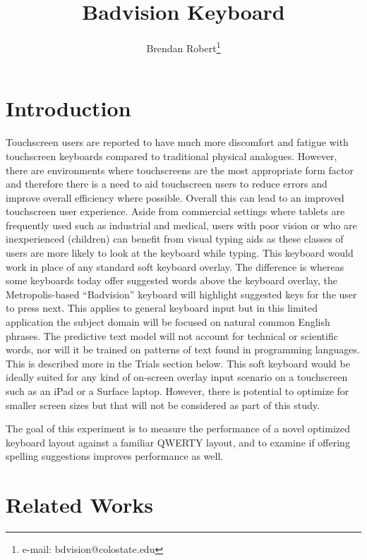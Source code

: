 \documentclass[english]{vgtc}
\author{Brendan Robert\thanks{e-mail: bdvision@colostate.edu}}
\begin{document}
\title{Badvision Keyboard}
\maketitle

\section{Introduction}

Touchscreen users are reported to have much more discomfort and fatigue
with touchscreen keyboards \cite{chaparro13} compared to traditional
physical analogues. However, there are environments where touchscreens
are the most appropriate form factor and therefore there is a need
to aid touchscreen users to reduce errors and improve overall efficiency
where possible. Overall this can lead to an improved touchscreen user
experience. Aside from commercial settings where tablets are frequently
used such as industrial and medical, users with poor vision or who
are inexperienced (children) can benefit from visual typing aids as
these classes of users are more likely to look at the keyboard while
typing. \cite{alhabri19} This keyboard would work in place of any
standard soft keyboard overlay. The difference is whereas some keyboards
today offer suggested words above the keyboard overlay, the Metropolis-based
\textquotedblleft Badvision\textquotedblright{} keyboard will highlight
suggested keys for the user to press next. This applies to general
keyboard input but in this limited application the subject domain
will be focused on natural common English phrases. The predictive
text model will not account for technical or scientific words, nor
will it be trained on patterns of text found in programming languages.
This is described more in the Trials section below. This soft keyboard
would be ideally suited for any kind of on-screen overlay input scenario
on a touchscreen such as an iPad or a Surface laptop. However, there
is potential to optimize for smaller screen sizes but that will not
be considered as part of this study.

The goal of this experiment is to measure the performance of a novel optimized keyboard layout against a familiar QWERTY layout, and to examine if offering spelling suggestions improves performance as well.

\section{Related Works}
\end{document}
